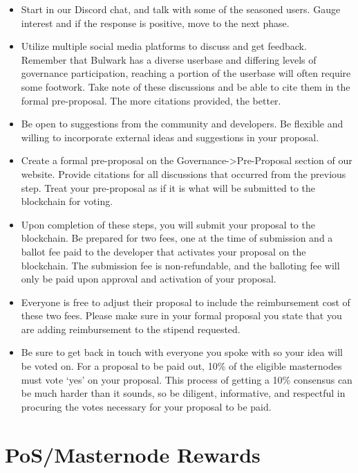 \documentclass[11pt,a4paperpaper,]{report}
\providecommand{\tightlist}{%
  \setlength{\itemsep}{0pt}\setlength{\parskip}{0pt}}
\begin{document}
\begin{itemize}
\tightlist
\item
  Start in our Discord chat, and talk with some of the seasoned users.
  Gauge interest and if the response is positive, move to the next
  phase.
\item
  Utilize multiple social media platforms to discuss and get feedback.
  Remember that Bulwark has a diverse userbase and differing levels of
  governance participation, reaching a portion of the userbase will
  often require some footwork. Take note of these discussions and be
  able to cite them in the formal pre-proposal. The more citations
  provided, the better.
\item
  Be open to suggestions from the community and developers. Be flexible
  and willing to incorporate external ideas and suggestions in your
  proposal.
\item
  Create a formal pre-proposal on the
  Governance-\textgreater{}Pre-Proposal section of our website. Provide
  citations for all discussions that occurred from the previous step.
  Treat your pre-proposal as if it is what will be submitted to the
  blockchain for voting.
\item
  Upon completion of these steps, you will submit your proposal to the
  blockchain. Be prepared for two fees, one at the time of submission
  and a ballot fee paid to the developer that activates your proposal on
  the blockchain. The submission fee is non-refundable, and the
  balloting fee will only be paid upon approval and activation of your
  proposal.
\item
  Everyone is free to adjust their proposal to include the reimbursement
  cost of these two fees. Please make sure in your formal proposal you
  state that you are adding reimbursement to the stipend requested.
\item
  Be sure to get back in touch with everyone you spoke with so your idea
  will be voted on. For a proposal to be paid out, 10\% of the eligible
  masternodes must vote `yes' on your proposal. This process of getting
  a 10\% consensus can be much harder than it sounds, so be diligent,
  informative, and respectful in procuring the votes necessary for your
  proposal to be paid.
\end{itemize}

\section{PoS/Masternode Rewards}\label{posmasternode-rewards}
\end{document}
